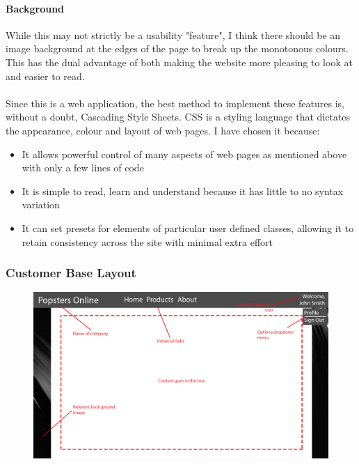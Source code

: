 ﻿\documentclass{article}
\begin{document}
    \paragraph{Background}
    While this may not strictly be a usability "feature", I think there should be an image background at the edges of the page to break up the monotonous colours.
    This has the dual advantage of both making the website more pleasing to look at and easier to read.
    \paragraph{}
    Since this is a web application, the best method to implement these features is, without a doubt, Cascading Style Sheets.
    CSS is a styling language that dictates the appearance, colour and layout of web pages.
    I have chosen it because:
    \begin{itemize}
        \item It allows powerful control of many aspects of web pages as mentioned above with only a few lines of code
        \item It is simple to read, learn and understand because it has little to no syntax variation
        \item It can set presets for elements of particular user defined classes, allowing it to retain consistency across the site with minimal extra effort
    \end{itemize}
    \newpage
    \subsubsection{Customer Base Layout}
    \begin{figure}[h]
        \includegraphics[width=\textwidth]{customerBasic.png}
        \centering
    \end{figure}
\end{document}
